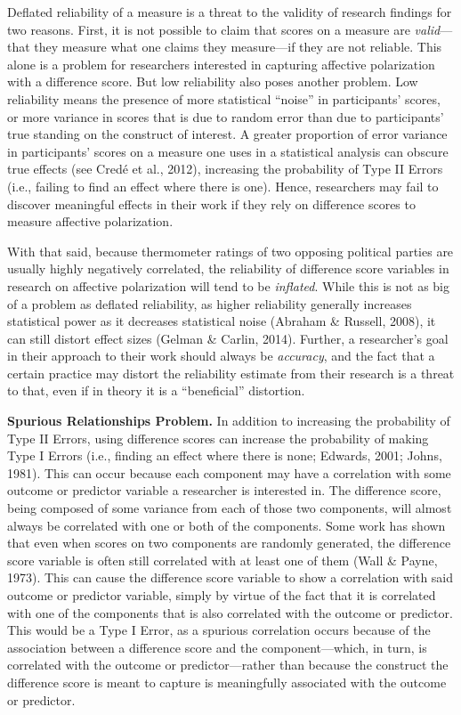 \documentclass[authordate, meta, issue]{jote-new-article}
\begin{document}
	Deflated reliability of a measure is a threat to the validity of research findings for two reasons. First, it is not possible to claim that scores on a measure are \emph{valid}—that they measure what one claims they measure—if they are not reliable. This alone is a problem for researchers interested in capturing affective polarization with a difference score. But low reliability also poses another problem. Low reliability means the presence of more statistical “noise” in participants' scores, or more variance in scores that is due to random error than due to participants' true standing on the construct of interest. A greater proportion of error variance in participants' scores on a measure one uses in a statistical analysis can obscure true effects (see Credé et al., 2012), increasing the probability of Type II Errors (i.e., failing to find an effect where there is one). Hence, researchers may fail to discover meaningful effects in their work if they rely on difference scores to measure affective polarization.



	With that said, because thermometer ratings of two opposing political parties are usually highly negatively correlated, the reliability of difference score variables in research on affective polarization will tend to be \emph{inflated}. While this is not as big of a problem as deflated reliability, as higher reliability generally increases statistical power as it decreases statistical noise (Abraham \& Russell, 2008), it can still distort effect sizes (Gelman \& Carlin, 2014). Further, a researcher's goal in their approach to their work should always be \emph{accuracy}, and the fact that a certain practice may distort the reliability estimate from their research is a threat to that, even if in theory it is a “beneficial” distortion.



	\textbf{Spurious Relationships Problem. }In addition to increasing the probability of Type II Errors, using difference scores can increase the probability of making Type I Errors (i.e., finding an effect where there is none; Edwards, 2001; Johns, 1981). This can occur because each component may have a correlation with some outcome or predictor variable a researcher is interested in. The difference score, being composed of some variance from each of those two components, will almost always be correlated with one or both of the components. Some work has shown that even when scores on two components are randomly generated, the difference score variable is often still correlated with at least one of them (Wall \& Payne, 1973). This can cause the difference score variable to show a correlation with said outcome or predictor variable, simply by virtue of the fact that it is correlated with one of the components that is also correlated with the outcome or predictor. This would be a Type I Error, as a spurious correlation occurs because of the association between a difference score and the component—which, in turn, is correlated with the outcome or predictor—rather than because the construct the difference score is meant to capture is meaningfully associated with the outcome or predictor.
\end{document}
